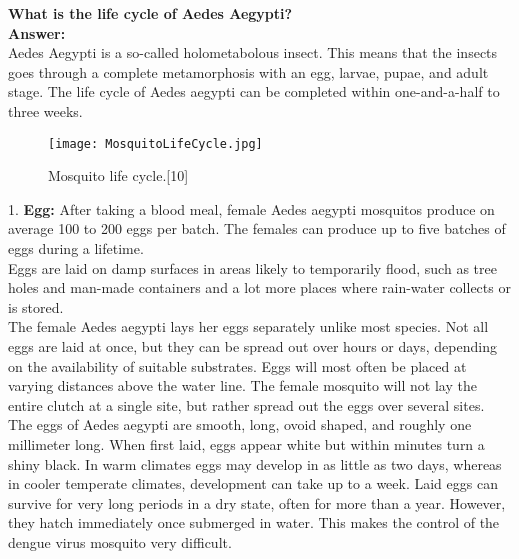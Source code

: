 \documentclass[11pt]{exam}
\begin{document}
\begin{questions}
\question
\label{6. Life cycle of Ae.aegypti}
\textbf{What is the life cycle of Aedes Aegypti?}\\
\textbf{Answer:} \\
Aedes Aegypti is a so-called holometabolous insect. This means that the insects goes through a complete metamorphosis with an egg, larvae, pupae, and adult stage. The life cycle of Aedes aegypti can be completed within one-and-a-half to three weeks. \\
\begin{figure}[H]
  \centering
  \texttt{[image: MosquitoLifeCycle.jpg]}\label{fig:f1}
  \caption{Mosquito life cycle.[10]}
\end{figure} 
1. \textbf{Egg:} After taking a blood meal, female Aedes aegypti mosquitos produce on average 100 to 200 eggs per batch. The females can produce up to five batches of eggs during a lifetime. \\ %
Eggs are laid on damp surfaces in areas likely to temporarily flood, such as tree holes and man-made containers and a lot more places where rain-water collects or is stored.\\%
The female Aedes aegypti lays her eggs separately unlike most species. Not all eggs are laid at once, but they can be spread out over hours or days, depending on the availability of suitable substrates. Eggs will most often be placed at varying distances above the water line. The female mosquito will not lay the entire clutch at a single site, but rather spread out the eggs over several sites.\\

The eggs of Aedes aegypti are smooth, long, ovoid shaped, and roughly one millimeter long. When first laid, eggs appear white but within minutes turn a shiny black. In warm climates eggs may develop in as little as two days, whereas in cooler temperate climates, development can take up to a week. Laid eggs can survive for very long periods in a dry state, often for more than a year. However, they hatch immediately once submerged in water. This makes the control of the dengue virus mosquito very difficult.\\ \\


\end{questions}
\end{document}
